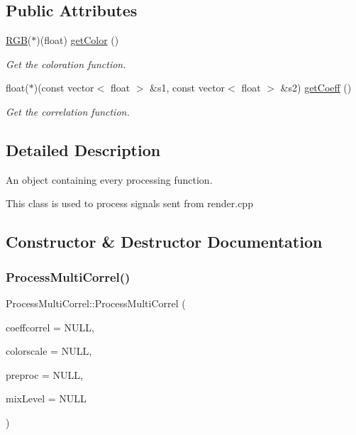 \subsection*{Public Attributes}
\begin{DoxyCompactItemize}
\item 
\mbox{\hyperlink{class_r_g_b}{R\+GB}}($\ast$)(float) \mbox{\hyperlink{class_process_multi_correl_a027833084b3b78a363c205ad1020ac8c}{get\+Color}} ()
\begin{DoxyCompactList}\small\item\em Get the coloration function. \end{DoxyCompactList}\item 
float($\ast$)(const vector$<$ float $>$ \&s1, const vector$<$ float $>$ \&s2) \mbox{\hyperlink{class_process_multi_correl_a5f932eae352e210a865fa7391ff0e06e}{get\+Coeff}} ()
\begin{DoxyCompactList}\small\item\em Get the correlation function. \end{DoxyCompactList}\end{DoxyCompactItemize}


\subsection{Detailed Description}
An object containing every processing function. 

This class is used to process signals sent from render.\+cpp 

\subsection{Constructor \& Destructor Documentation}
\mbox{\label{class_process_multi_correl_ab24bdd4426846c03e160ee418ef53962}} 
\subsubsection{\texorpdfstring{Process\+Multi\+Correl()}{ProcessMultiCorrel()}}
{\footnotesize\ttfamily Process\+Multi\+Correl\+::\+Process\+Multi\+Correl (\begin{DoxyParamCaption}\item[{float($\ast$)(const vector$<$ float $>$ \&s1, const vector$<$ float $>$ \&s2)}]{coeffcorrel = {\ttfamily NULL},  }\item[{\mbox{\hyperlink{class_r_g_b}{R\+GB}}($\ast$)(float coeff)}]{colorscale = {\ttfamily NULL},  }\item[{\mbox{\hyperlink{class_matrix}{Matrix}}$<$ float $>$($\ast$)(const \mbox{\hyperlink{class_matrix}{Matrix}}$<$ float $>$ \&buff)}]{preproc = {\ttfamily NULL},  }\item[{vector$<$ float $>$($\ast$)(const \mbox{\hyperlink{class_matrix}{Matrix}}$<$ float $>$ \&correl\+Matrix)}]{mix\+Level = {\ttfamily NULL} }\end{DoxyParamCaption})}



